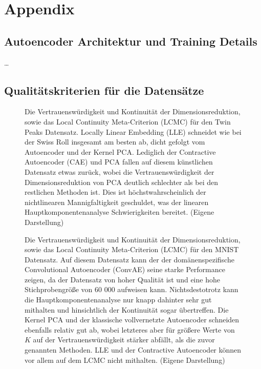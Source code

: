 
\chapter{Appendix}
\label{ch:Appendix}

\section{Autoencoder Architektur und Training Details}
\label{ch:Appendix:Architektur-Details}

\dots

\section{Qualitätskriterien für die Datensätze}
\label{ch:Appendix:Qualitaetskriterien}
\begin{figure}[ht]
	\begin{center}
		
	\end{center}
	\caption[Twin Peaks Qualitätskriterien]{Die Vertrauenswürdigkeit und Kontinuität der Dimensionsreduktion, sowie das Local Continuity Meta-Criterion (LCMC) für den Twin Peaks Datensatz. Locally Linear Embedding (LLE) schneidet wie bei der Swiss Roll insgesamt am besten ab, dicht gefolgt vom Autoencoder und der Kernel PCA. Lediglich der Contractive Autoencoder (CAE) und PCA fallen auf diesem künstlichen Datensatz etwas zurück, wobei die Vertrauenswürdigkeit der Dimensionsreduktion von PCA deutlich schlechter als bei den restlichen Methoden ist. Dies ist höchstwahrscheinlich der nichtlinearen Mannigfaltigkeit geschuldet, was der linearen Hauptkomponentenanalyse Schwierigkeiten bereitet. (Eigene Darstellung)}
	\label{fig:TwinPeaksMetrics}
\end{figure}
\begin{figure}[ht]
	\begin{center}
		
	\end{center}
	\caption[MNIST Qualitätskriterien]{Die Vertrauenswürdigkeit und Kontinuität der Dimensionsreduktion, sowie das Local Continuity Meta-Criterion (LCMC) für den MNIST Datensatz. Auf diesem Datensatz kann der der domänenspezifische Convolutional Autoencoder (ConvAE) seine starke Performance zeigen, da der Datensatz von hoher Qualität ist und eine hohe Stichprobengröße von 60 000 aufweisen kann. Nichtsdestotrotz kann die Hauptkomponentenanalyse nur knapp dahinter sehr gut mithalten und hinsichtlich der Kontinuität sogar übertreffen. Die Kernel PCA und der klassische vollvernetzte Autoencoder schneiden ebenfalls relativ gut ab, wobei letzteres aber für größere Werte von $K$ auf der Vertrauenswürdigkeit stärker abfällt, als die zuvor genannten Methoden. LLE und der Contractive Autoencoder können vor allem auf dem LCMC nicht mithalten. (Eigene Darstellung)}
	\label{fig:MNISTMetrics}
\end{figure}

